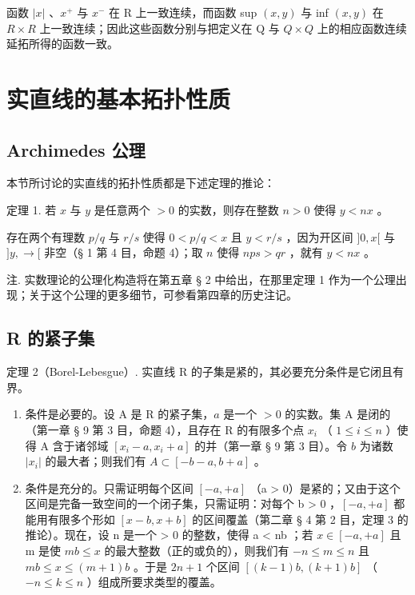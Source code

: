 函数 \(|x|\) 、\(x^{+}\) 与 \(x^{-}\) 在 R 上一致连续，而函数 sup \((x, y)\) 与 inf \((x, y)\) 在 \(R \times R\) 上一致连续；因此这些函数分别与把定义在 Q 与 \(Q \times Q\) 上的相应函数连续延拓所得的函数一致。

\section{实直线的基本拓扑性质}

\subsection{Archimedes 公理}

本节所讨论的实直线的拓扑性质都是下述定理的推论：

定理 1. 若 \(x\) 与 \(y\) 是任意两个 \(>0\) 的实数，则存在整数 \(n > 0\) 使得 \(y < nx\) 。

存在两个有理数 \(p / q\) 与 \(r / s\) 使得 \(0 < p / q < x\) 且 \(y < r / s\) ，因为开区间 \(]0, x[\) 与 \(]y, \rightarrow[\) 非空（§ 1 第 4 目，命题 4）；取 \(n\) 使得 \(nps > qr\) ，就有 \(y < nx\) 。

注. 实数理论的公理化构造将在第五章 § 2 中给出，在那里定理 1 作为一个公理出现；关于这个公理的更多细节，可参看第四章的历史注记。

\subsection{R 的紧子集}

定理 2（Borel-Lebesgue）. 实直线 R 的子集是紧的，其必要充分条件是它闭且有界。

\begin{enumerate}
\def\labelenumi{\arabic{enumi})}
\item
  条件是必要的。设 A 是 R 的紧子集，\(a\) 是一个 \(>0\) 的实数。集 A 是闭的（第一章 § 9 第 3 目，命题 4），且存在 R 的有限多个点 \(x_{i}\) （ \(1 \leqslant i \leqslant n\) ）使得 A 含于诸邻域 \([x_{i} - a, x_{i} + a]\) 的并（第一章 § 9 第 3 目）。令 \(b\) 为诸数 \(|x_{i}|\) 的最大者；则我们有 \(A \subset [-b - a, b + a]\) 。
\item
  条件是充分的。只需证明每个区间 \([-a, +a]\) （a \textgreater{} 0）是紧的；又由于这个区间是完备一致空间的一个闭子集，只需证明：对每个 b \textgreater{} 0 ，\([-a, +a]\) 都能用有限多个形如 \([x - b, x + b]\) 的区间覆盖（第二章 § 4 第 2 目，定理 3 的推论）。现在，设 n 是一个 \textgreater{} 0 的整数，使得 a \textless{} nb ；若 \(x \in [-a, +a]\) 且 m 是使 \(mb \leqslant x\) 的最大整数（正的或负的），则我们有 \(-n \leqslant m \leqslant n\) 且 \(mb \leqslant x \leqslant (m + 1)b\) 。于是 \(2n + 1\) 个区间 \([(k - 1)b, (k + 1)b]\) （ \(-n \leqslant k \leqslant n\) ）组成所要求类型的覆盖。
\end{enumerate}

